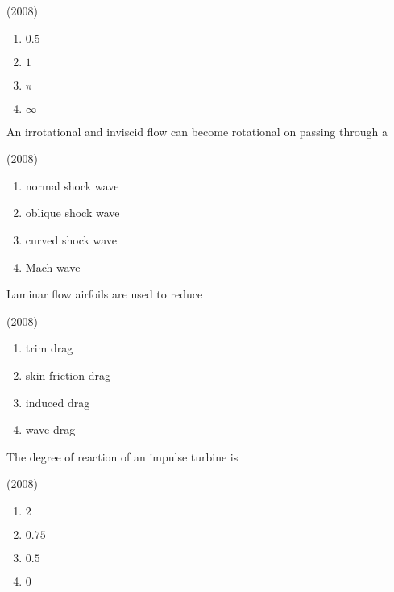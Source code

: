     \hfill{(2008)}

        \begin{multicols}{4}
            \begin{enumerate}
                \item $0.5$
                \item $1$
                \item $\pi$
                \item $\infty$
            \end{enumerate}
        \end{multicols}
        
    \item An irrotational and inviscid flow can become rotational on passing through a
    
    \hfill{(2008)}

        \begin{multicols}{2}
            \begin{enumerate}
                \item normal shock wave
                \item oblique shock wave
                \item curved shock wave
                \item Mach wave
            \end{enumerate}
        \end{multicols}

    \item Laminar flow airfoils are used to reduce 
    
    \hfill{(2008)}

        \begin{multicols}{4}
            \begin{enumerate}
                \item trim drag
                \item skin friction drag
                \item induced drag
                \item wave drag
            \end{enumerate}
        \end{multicols}
        
    \item The degree of reaction of an impulse turbine is 
    
    \hfill{(2008)}

        \begin{multicols}{4}
            \begin{enumerate}
                \item $2$
                \item $0.75$
                \item $0.5$
                \item $0$
            \end{enumerate}
        \end{multicols}

